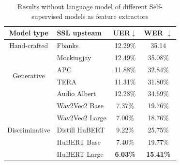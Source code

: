 \begin{table}[ht]
  \centering
  \begin{tabular}{clcc}
  \hline
  Model type                      & SSL upsteam    & UER$\downarrow$ & WER $\downarrow$ \\ \hline
  Hand-crafted                    & Fbanks         & 12.29\%                                                           & 35.14            \\ \hline
  \multirow{4}{*}{Generative}     & Mockingjay     & 12.49\%                                                           & 35.08\%          \\
                                  & APC            & 11.88\%                                                           & 32.84\%          \\
                                  & TERA           & 11.31\%                                                           & 31.80\%          \\
                                  & Audio Albert   & 12.28\%                                                           & 34.69\%          \\ \hline
  \multirow{5}{*}{Discriminative} & Wav2Vec2 Base  & 7.37\%                                                            & 19.76\%          \\
                                  & Wav2Vec2 Large & 7.00\%                                                            & 18.76\%          \\
                                  & Distill HuBERT & 9.22\%                                                            & 25.75\%          \\
                                  & HuBERT Base    & 7.40\%                                                            & 19.77\%          \\
                                  & HuBERT Large   & \textbf{6.03\%}                                                   & \textbf{15.41\%} \\ \hline
  \end{tabular}
  \caption{Results without language model of different Self-supervised models as feature extractors}
\label{tab:ssl}
  \end{table}

